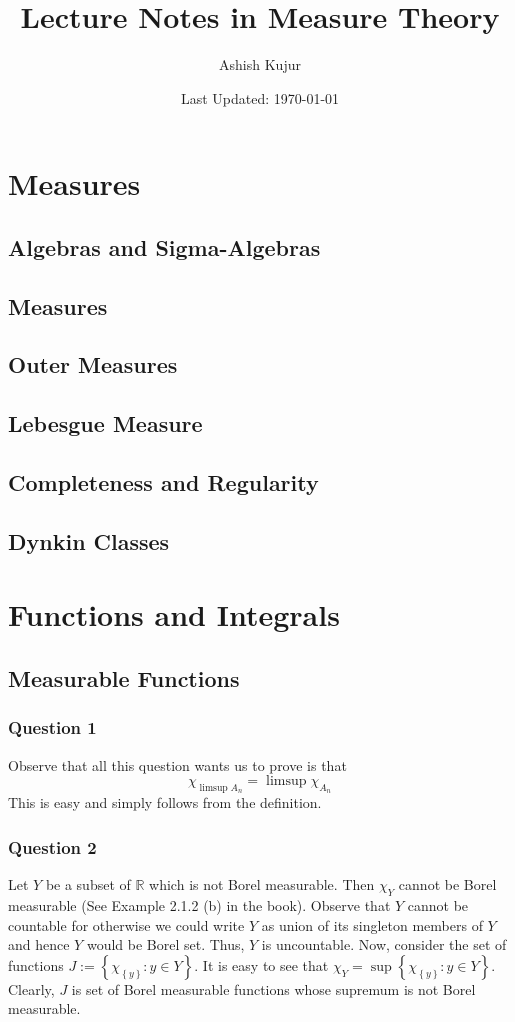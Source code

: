 \documentclass[12pt]{article}
\title{Lecture Notes in Measure Theory}
\author{Ashish Kujur}
\date{Last Updated: \today}
\theoremstyle{definition}
\theoremstyle{remark}
\theoremstyle{plain}
\newcommand{\R}{\mathbb R}
\begin{document}
\tableofcontents

\newpage

\section{Measures}
\subsection{Algebras and Sigma-Algebras}
\subsection{Measures}
\subsection{Outer Measures}
\subsection{Lebesgue Measure}
\subsection{Completeness and Regularity}
\subsection{Dynkin Classes}

\newpage

\section{Functions and Integrals}
\subsection{Measurable Functions}

\subsubsection{Question 1}
Observe that all this question wants us to prove is that
\begin{equation*}
    \chi_{\limsup A_n}=\limsup \chi _ {A_n}
    \label{<+label+>}
\end{equation*}
This is easy and simply follows from the definition.

\subsubsection{Question 2}
Let $Y$ be a subset of $\R$ which is not Borel measurable. Then $\chi _ Y$ cannot be Borel measurable (See Example 2.1.2 (b) in the book). Observe that $Y$ cannot be countable for otherwise we could write $Y$ as union of its singleton members of $Y$ and hence $Y$ would be Borel set. Thus, $Y$ is uncountable.
Now, consider the set of functions $J:=\left\{ \chi_{\left\{ y \right\}}: y\in Y \right\}$. It is easy to see that $\chi _{Y} =\sup \left\{ \chi_{\left\{ y \right\}}: y\in Y \right\}$. Clearly, $J$ is set of Borel measurable functions whose supremum is not Borel measurable.
\end{document}

